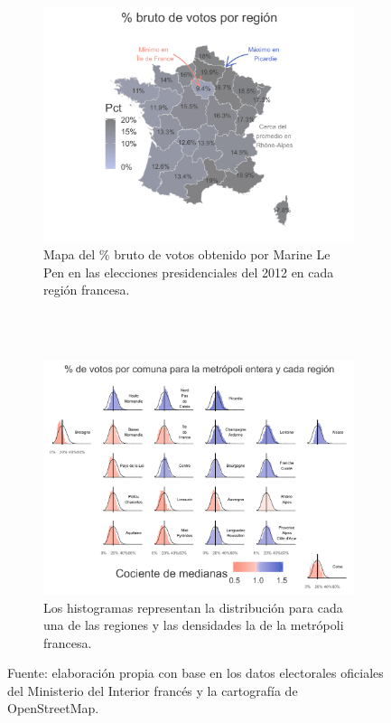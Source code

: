 \begin{figure}[H]
	\centering
	\begin{subfigure}{0.7\textwidth}
	\includegraphics[width = \textwidth]{Figs/AED/Pct_Br_Reg_P12_FN}
	\caption{Mapa del \% bruto de votos obtenido por Marine Le Pen en las elecciones presidenciales del 2012 en cada región francesa.}
	\label{fig:Pct_Br_Reg_P12}		
	\end{subfigure}\\
	~
	\begin{subfigure}{0.9\textwidth}
	\includegraphics[width = \textwidth]{Figs/AED/Geofacet_Reg_P12_FN}
	\caption{Los histogramas representan la distribución para cada una de las regiones y las densidades la de la metrópoli francesa.}
	\label{fig:Geofacet_Distr_Reg_P12}
	\end{subfigure}
	\caption{Fuente: elaboración propia con base en los datos electorales oficiales del Ministerio del Interior francés y la cartografía de OpenStreetMap.}
\end{figure}

